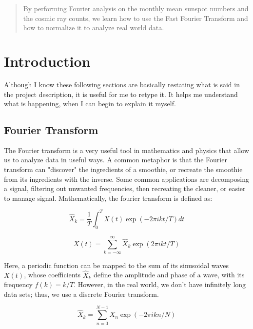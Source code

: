 \documentclass[12pt]{article}
\begin{document}
\maketitle

\begin{abstract}
By performing Fourier analysis on the monthly mean sunspot numbers and the cosmic ray counts, we learn how to use the Fast Fourier Transform and how to normalize it to analyze real world data.
\end{abstract}

\section*{Introduction}

Although I know these following sections are basically restating what is said in the project description, it is useful for me to retype it. It helps me understand what is happening, when I can begin to explain it myself.

\subsection*{Fourier Transform}

The Fourier transform is a very useful tool in mathematics and physics that allow us to analyze data in useful ways. A common metaphor is that the Fourier transform can "discover" the ingredients of a smoothie, or recreate the smoothie from its ingredients with the inverse. Some common applications are decomposing a signal, filtering out unwanted frequencies, then recreating the cleaner, or easier to manage signal. Mathematically, the fourier transform is defined as:

\begin{equation}
\hat{X}_k = \frac{1}{T} \int^{T}_{0} X(t) \exp{\left( -2\pi i kt/T \right)} d t
\end{equation}

\begin{equation}
X(t) = \sum_{k=-\infty}^{\infty} \hat{X}_k \exp{\left( 2\pi i kt/T \right)}
\end{equation}

Here, a periodic function can be mapped to the sum of its sinusoidal waves $X(t)$, whose coefficients $\hat{X}_k$ define the amplitude and phase of a wave, with its frequency $f(k) = k/T$. However, in the real world, we don't have infinitely long data sets; thus, we use a discrete Fourier transform.

\begin{equation}
\hat{X}_k = \sum_{n=0}^{N-1} X_n \exp{\left( -2 \pi i k n / N \right)}
\end{equation}
\end{document}
